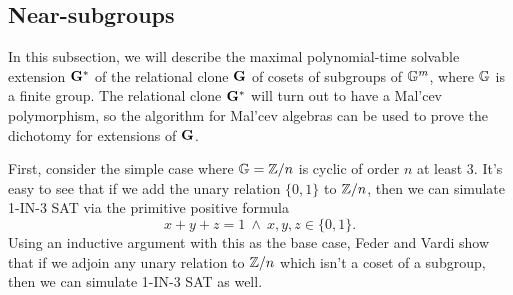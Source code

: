 \documentclass[letterpaper,11pt]{article}
\begin{document}
\subsection{Near-subgroups}

In this subsection, we will describe the maximal polynomial-time solvable extension $\mathbf{G}^*$ of the relational clone $\mathbf{G}$ of cosets of subgroups of $\mathbb{G}^m$, where $\mathbb{G}$ is a finite group. The relational clone $\mathbf{G}^*$ will turn out to have a Mal'cev polymorphism, so the algorithm for Mal'cev algebras can be used to prove the dichotomy for extensions of $\mathbf{G}$.

First, consider the simple case where $\mathbb{G} = \mathbb{Z}/n$ is cyclic of order $n$ at least $3$. It's easy to see that if we add the unary relation $\{0,1\}$ to $\mathbb{Z}/n$, then we can simulate 1-IN-3 SAT via the primitive positive formula
\[
x+y+z = 1\ \wedge\ x,y,z \in \{0,1\}.
\]
Using an inductive argument with this as the base case, Feder and Vardi \cite{feder-vardi} show that if we adjoin any unary relation to $\mathbb{Z}/n$ which isn't a coset of a subgroup, then we can simulate 1-IN-3 SAT as well.%
\end{document}
